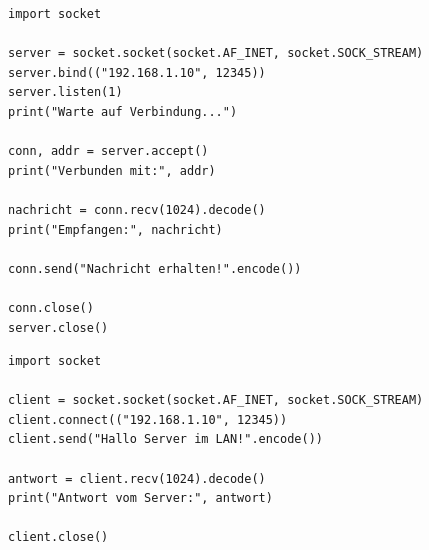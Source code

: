 \begin{myexercise}
    \begin{myanswer}
        \begin{lstlisting}[caption=\texttt{server.py}]
import socket

server = socket.socket(socket.AF_INET, socket.SOCK_STREAM)
server.bind(("192.168.1.10", 12345))
server.listen(1)
print("Warte auf Verbindung...")

conn, addr = server.accept()
print("Verbunden mit:", addr)

nachricht = conn.recv(1024).decode()
print("Empfangen:", nachricht)

conn.send("Nachricht erhalten!".encode())

conn.close()
server.close()
        \end{lstlisting}
        \begin{lstlisting}[caption=\texttt{client.py}]
import socket

client = socket.socket(socket.AF_INET, socket.SOCK_STREAM)
client.connect(("192.168.1.10", 12345))
client.send("Hallo Server im LAN!".encode())

antwort = client.recv(1024).decode()
print("Antwort vom Server:", antwort)

client.close()
        \end{lstlisting}
    \end{myanswer}
\end{myexercise}

